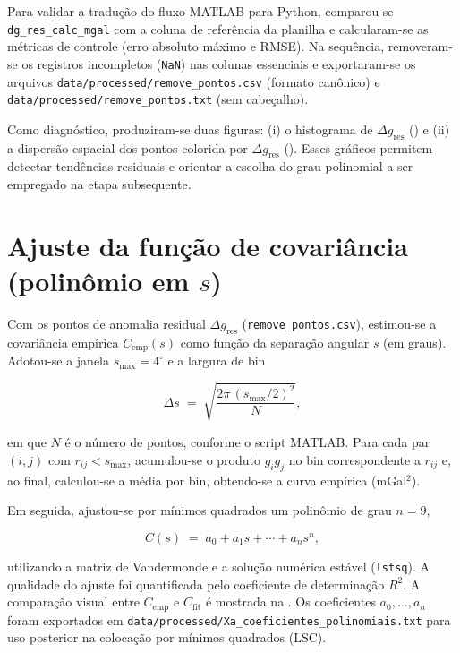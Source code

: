Para validar a tradução do fluxo MATLAB para Python, comparou-se \texttt{dg\allowbreak\_res\allowbreak\_calc\allowbreak\_mgal} com a coluna de referência da planilha e calcularam-se as métricas de controle (erro absoluto máximo e RMSE). Na sequência, removeram-se os registros incompletos (\texttt{NaN}) nas colunas essenciais e exportaram-se os arquivos \texttt{data/processed/remove\allowbreak\_pontos.csv} (formato canônico) e \texttt{data/processed/remove\allowbreak\_pontos.txt} (sem cabeçalho).

Como diagnóstico, produziram-se duas figuras: (i) o histograma de $\Delta g_{\text{res}}$ () e (ii) a dispersão espacial dos pontos colorida por $\Delta g_{\text{res}}$ (). Esses gráficos permitem detectar tendências residuais e orientar a escolha do grau polinomial a ser empregado na etapa subsequente.


\section{Ajuste da função de covariância (polinômio em $s$)}

Com os pontos de anomalia residual $\Delta g_{\text{res}}$ (\texttt{remove\allowbreak\_pontos.csv}), estimou-se a covariância empírica $C_{\text{emp}}(s)$ como função da separação angular $s$ (em graus). Adotou-se a janela $s_{\max}=4^\circ$ e a largura de bin

\begin{equation}
    \Delta s \;=\; \sqrt{\frac{2\pi\,(s_{\max}/2)^2}{N}},
\end{equation}


\noindent em que $N$ é o número de pontos, conforme o script MATLAB. Para cada par $(i,j)$ com $r_{ij}<s_{\max}$, acumulou-se o produto $g_i g_j$ no bin correspondente a $r_{ij}$ e, ao final, calculou-se a média por bin, obtendo-se a curva empírica (mGal$^2$).

Em seguida, ajustou-se por mínimos quadrados um polinômio de grau $n=9$,

\begin{equation}
    C(s)\;=\;a_0 + a_1 s + \cdots + a_n s^n,
\end{equation}

\noindent utilizando a matriz de Vandermonde e a solução numérica estável (\texttt{lstsq}). A qualidade do ajuste foi quantificada pelo coeficiente de determinação $R^2$. A comparação visual entre $C_{\text{emp}}$ e $C_{\text{fit}}$ é mostrada na . Os coeficientes $a_0,\ldots,a_n$ foram exportados em \texttt{data/processed/Xa\allowbreak\_coeficientes\allowbreak\_polinomiais.txt} para uso posterior na colocação por mínimos quadrados (LSC).

